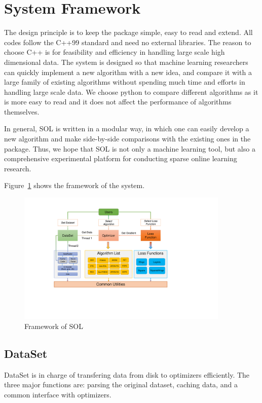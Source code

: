\documentclass[11pt,a4paper]{article}
\begin{document}
\section{System Framework}

The design principle is to keep the package simple, easy to read and extend.
All codes follow the C++99 standard and need no external libraries. The reason
to choose C++ is for feasibility and efficiency in handling large scale high
dimensional data. The system is designed so that machine learning researchers
can quickly implement a new algorithm with a new idea, and compare it with a
large family of existing algorithms without spending much time and efforts in
handling large scale data. We choose python to compare different algorithms as
it is more easy to read and it does not affect the performance of algorithms
themselves.

In general, SOL is written in a modular way, in which one can easily develop a
new algorithm and make side-by-side comparisons with the existing ones in the
package. Thus, we hope that SOL is not only a machine learning tool, but also a
comprehensive experimental platform for conducting sparse online learning research.

Figure~\ref{fig:framework} shows the framework of the system.
\begin{figure}[!ht]
    \centering
    \includegraphics[clip=true, viewport=280 290 1340 1050, width=0.9\textwidth]{figs/framework.pdf}
    \caption{Framework of SOL}
    \label{fig:framework}
\end{figure}

\subsection{DataSet}

DataSet is in charge of transfering data from disk to optimizers efficiently. The three major functions are: parsing the original dataset, caching data, and a common interface with optimizers.
\end{document}
